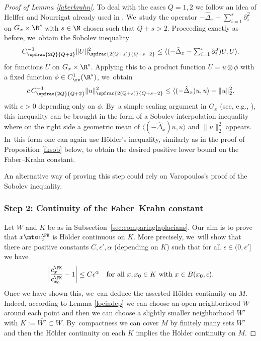 \begin{proof}[Proof of Lemma \ref{faberkrahn}]
To deal with the cases $Q=1,2$ we follow an idea of Helffer and Nourrigat already used in \cite{Rot}. We~study the operator $-\hat\Delta_x - \sum_{i=1}^s \partial_i^2$ on $G_x\times\R^s$ with $s\in\N$ chosen such that $Q+s>2$. Proceeding exactly as before, we~obtain the Sobolev inequality
\[
C_{\spfrac{2Q}{Q+2}}^{-1} \| U \|_{\spfrac{2(Q+s)}{Q+s-2}}^2 \leq \langle (-\hat\Delta_x - \textstyle\sum_{i=1}^s \partial_i^2) U,U \rangle.
\]
for functions $U$ on $G_x\times\R^s$. Applying this to a product function $U = u\otimes \phi$ with a fixed function $\phi\in C^1_\rc(\R^s)$, we~obtain
\[
c\,C_{\spfrac{2Q}{Q+2}}^{-1} \| u \|_{\spfrac{2(Q+s)}{Q+s-2}}^2 \leq \langle (-\hat\Delta_x) u, u \rangle + \|u\|_2^2.
\]
with $c>0$ depending only on $\phi$. By~a simple scaling argument in $G_x$ (see, e.g., \cite[Rem.\,2.47]{FLW}), this inequality can be brought in the form of a Sobolev interpolation inequality where on the right side a geometric mean of $\langle (-\hat\Delta_x) u, u \rangle$ and $\|u\|_2^2$ appears. In~this form one can again use Hölder's inequality, similarly as in the proof of Proposition \ref{fksob} below, to obtain the desired positive lower bound on the Faber--Krahn constant.

An alternative way of proving this step could rely on Varopoulos's proof \cite{Va} of the Sobolev inequality.

\subsubsection*{Step 2: Continuity of the Faber--Krahn constant\protect\footnotemark}
Let $W$ and $K$ be as in Subsection~\ref{sec:comparinglaplacians}. Our aim is to prove that $x\mto c_x^\FK$ is Hölder continuous on $K$. More precisely, we~will show that there are positive constants $C,\epsilon',\alpha$ (depending on $K$) such that for all $\epsilon\in(0,\epsilon']$ we have
\begin{equation}
\label{eq:fkholder}
\left| \frac{c^\FK_x}{c^\FK_{x_0}} - 1\right| \leq C \epsilon^\alpha
\quad\text{for all}\ x,x_0\in K \ \text{with}\ x\in B(x_0,\epsilon).
\end{equation}
Once we have shown this, we~can deduce the asserted Hölder continuity on $M$. Indeed, according to Lemma \ref{locindep} we can choose an open neighborhood $W$ around each point and then we can choose a slightly smaller neighborhood $W'$ with $K:=\overline{W'}\subset W$. By~compactness we can cover $M$ by finitely many sets $W'$ and then the Hölder continuity on each $K$ implies the Hölder continuity on $M$.


\end{proof}
